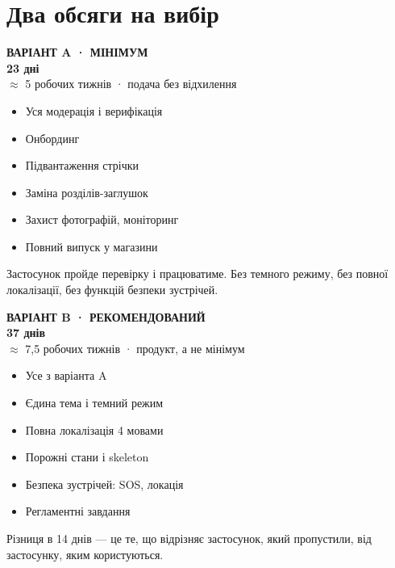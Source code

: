 \documentclass[11pt,a4paper]{article}
\begin{document}
\section{Два обсяги на вибір}

\vspace{4pt}
\noindent
\begin{minipage}[t]{0.475\textwidth}
\begin{tcolorbox}[enhanced, colback=surface, colframe=line, boxrule=0.4pt,
                  arc=0pt, outer arc=0pt, left=10pt, right=10pt, top=9pt, bottom=9pt]
{\color{muted}\footnotesize\bfseries ВАРІАНТ A · МІНІМУМ}\\[6pt]
{\color{ink}\LARGE\bfseries 23 дні}\\[2pt]
{\color{muted}\footnotesize $\approx$ 5 робочих тижнів · подача без відхилення}\\[8pt]
\begin{itemize}[leftmargin=1em]
  \item Уся модерація і верифікація
  \item Онбординг
  \item Підвантаження стрічки
  \item Заміна розділів-заглушок
  \item Захист фотографій, моніторинг
  \item Повний випуск у магазини
\end{itemize}
\vspace{4pt}
{\color{muted}\footnotesize Застосунок пройде перевірку і працюватиме. Без темного
режиму, без повної локалізації, без функцій безпеки зустрічей.}
\end{tcolorbox}
\end{minipage}
\hfill
\begin{minipage}[t]{0.475\textwidth}
\begin{tcolorbox}[enhanced, colback=surface, colframe=line, boxrule=0.4pt,
                  arc=0pt, outer arc=0pt, left=10pt, right=10pt, top=9pt, bottom=9pt,
                  borderline north={2pt}{0pt}{accent}]
{\color{accent}\footnotesize\bfseries ВАРІАНТ B · РЕКОМЕНДОВАНИЙ}\\[6pt]
{\color{ink}\LARGE\bfseries 37 днів}\\[2pt]
{\color{muted}\footnotesize $\approx$ 7,5 робочих тижнів · продукт, а не мінімум}\\[8pt]
\begin{itemize}[leftmargin=1em]
  \item Усе з варіанта A
  \item Єдина тема і темний режим
  \item Повна локалізація 4 мовами
  \item Порожні стани і skeleton
  \item Безпека зустрічей: SOS, локація
  \item Регламентні завдання
\end{itemize}
\vspace{4pt}
{\color{muted}\footnotesize Різниця в 14 днів --- це те, що відрізняє застосунок,
який пропустили, від застосунку, яким користуються.}
\end{tcolorbox}
\end{minipage}
\end{document}

